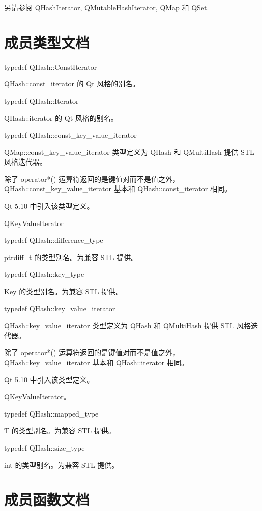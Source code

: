 另请参阅 QHashIterator, QMutableHashIterator, QMap 和 QSet.

\section{成员类型文档}

typedef QHash::ConstIterator

QHash::const\_iterator 的 Qt 风格的别名。

typedef QHash::Iterator

QHash::iterator 的 Qt 风格的别名。

typedef QHash::const\_key\_value\_iterator

QMap::const\_key\_value\_iterator 类型定义为 QHash 和 QMultiHash 提供 STL 风格迭代器。

除了 operator*() 运算符返回的是键值对而不是值之外，QHash::const\_key\_value\_iterator 基本和 QHash::const\_iterator 相同。

Qt 5.10 中引入该类型定义。

\begin{seeAlso}
QKeyValueIterator
\end{seeAlso}

typedef QHash::difference\_type

ptrdiff\_t 的类型别名。为兼容 STL 提供。

typedef QHash::key\_type

Key 的类型别名。为兼容 STL 提供。

typedef QHash::key\_value\_iterator

QHash::key\_value\_iterator 类型定义为 QHash 和 QMultiHash 提供 STL 风格迭代器。

除了 operator*() 运算符返回的是键值对而不是值之外，QHash::key\_value\_iterator 基本和 QHash::iterator 相同。

Qt 5.10 中引入该类型定义。

\begin{seeAlso}
QKeyValueIterator。
\end{seeAlso}

typedef QHash::mapped\_type

T 的类型别名。为兼容 STL 提供。

typedef QHash::size\_type

int 的类型别名。为兼容 STL 提供。

\section{成员函数文档}

